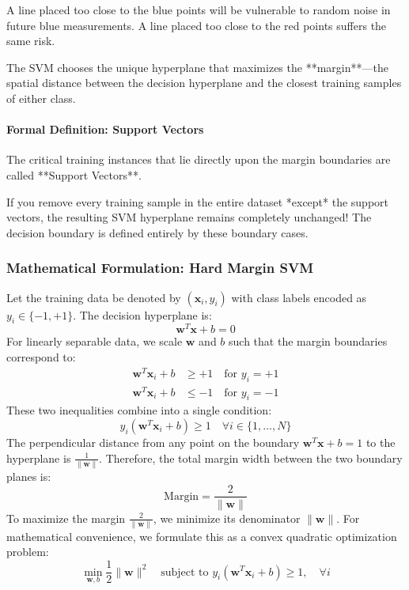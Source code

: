 A line placed too close to the blue points will be vulnerable to random noise in future blue measurements. A line placed too close to the red points suffers the same risk.

The SVM chooses the unique hyperplane that maximizes the **margin**---the spatial distance between the decision hyperplane and the closest training samples of either class.

\paragraph{Formal Definition: Support Vectors}
The critical training instances that lie directly upon the margin boundaries are called **Support Vectors**. 
\begin{keyidea}
If you remove every training sample in the entire dataset *except* the support vectors, the resulting SVM hyperplane remains completely unchanged! The decision boundary is defined entirely by these boundary cases.
\end{keyidea}

\subsubsection{Mathematical Formulation: Hard Margin SVM}
Let the training data be denoted by $(\mathbf{x}_i, y_i)$ with class labels encoded as $y_i \in \{-1, +1\}$. 
The decision hyperplane is:
\begin{equation}
\mathbf{w}^T \mathbf{x} + b = 0
\end{equation}
For linearly separable data, we scale $\mathbf{w}$ and $b$ such that the margin boundaries correspond to:
\begin{align}
\mathbf{w}^T \mathbf{x}_i + b &\ge +1 \quad \text{for } y_i = +1 \\
\mathbf{w}^T \mathbf{x}_i + b &\le -1 \quad \text{for } y_i = -1
\end{align}
These two inequalities combine into a single condition:
\begin{equation}
y_i (\mathbf{w}^T \mathbf{x}_i + b) \ge 1 \quad \forall i \in \{1, \dots, N\}\label{eq:svm_hard_constraint}
\end{equation}
The perpendicular distance from any point on the boundary $\mathbf{w}^T \mathbf{x} + b = 1$ to the hyperplane is $\frac{1}{\|\mathbf{w}\|}$. Therefore, the total margin width between the two boundary planes is:
\begin{equation}
\text{Margin} = \frac{2}{\|\mathbf{w}\|}\label{eq:svm_margin_width}
\end{equation}
To maximize the margin $\frac{2}{\|\mathbf{w}\|}$, we minimize its denominator $\|\mathbf{w}\|$. For mathematical convenience, we formulate this as a convex quadratic optimization problem:
\begin{equation}
\min_{\mathbf{w}, b} \frac{1}{2} \|\mathbf{w}\|^2 \quad \text{subject to } y_i (\mathbf{w}^T \mathbf{x}_i + b) \ge 1, \quad \forall i\label{eq:svm_hard_optimization}
\end{equation}

